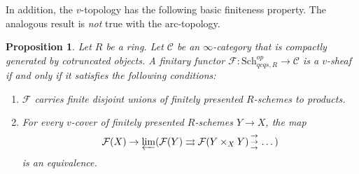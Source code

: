 \documentclass[reqno]{amsart}
\newcommand{\triplearrows}{\begin{smallmatrix} \to \\ \to \\ 
\to \end{smallmatrix} }
\newcommand{\arc}{\mathrm{arc}}
\newtheorem{proposition}[theorem]{Proposition}
\theoremstyle{definition}
\begin{document}
In addition,  the  $v$-topology has the following basic finiteness property.  The analogous result is \emph{not} true with the $\arc$-topology. 


\begin{proposition} 
\label{finitevtopology}
Let $R$ be a ring. Let $\mathcal{C}$ be an $\infty$-category that is compactly generated by cotruncated objects. 
A finitary functor $\mathcal{F}\colon  \mathrm{Sch}_{qcqs,R}^{op} \to \mathcal{C}$ is a $v$-sheaf if and only
if it satisfies the following conditions:
\begin{enumerate}
\item $\mathcal{F}$ carries finite disjoint unions of finitely presented $R$-schemes to
products. 
\item For every $v$-cover of finitely presented $R$-schemes $Y \to X$,  the map 
\[ \mathcal{F}(X) \to \varprojlim ( \mathcal{F}(Y) \rightrightarrows \mathcal{F}(Y \times_X Y) \triplearrows \dots )\]
is an equivalence. 
\end{enumerate}
\end{proposition} 
\end{document}
